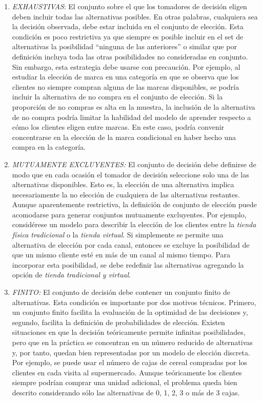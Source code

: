 \documentclass[
]{book}
\begin{document}
\begin{enumerate}
\def\labelenumi{\arabic{enumi}.}
\item
  \emph{EXHAUSTIVAS}: El conjunto sobre el que los tomadores de decisión eligen deben incluir todas las alternativas posibles. En otras palabras, cualquiera sea la decisión observada, debe
  estar incluida en el conjunto de elección. Esta condición es poco restrictiva ya que siempre es posible incluir en el set de alternativas la posibilidad ``ninguna de las anteriores'' o similar que por definición incluya toda las otras posibilidades no consideradas en conjunto. Sin embargo, esta estrategia debe usarse con precaución. Por ejemplo, al estudiar la elección de marca en una categoría en que se observa que los clientes no siempre compran alguna
  de las marcas disponibles, se podría incluir la alternativa de no compra en el conjunto de elección. Si la proporción de no compras es alta en la muestra, la inclusión de la alternativa de no compra podría limitar la habilidad del modelo de aprender respecto a cómo los clientes eligen entre marcas. En este caso, podría convenir concentrarse en la elección de la marca condicional en haber hecho una compra en la categoría.
\item
  \emph{MUTUAMENTE EXCLUYENTES:} El conjunto de decisión debe definirse de modo que en cada ocasión el tomador de decisión seleccione solo una de las alternativas disponibles. Esto es, la elección de una alternativa implica necesariamente la no elección de cualquiera de las alternativas restantes. Aunque aparentemente restrictiva, la definición de conjunto de elección puede acomodarse para generar conjuntos mutuamente excluyentes. Por ejemplo, considérese un modelo para describir la elección de los clientes entre la \emph{tienda física tradicional} o la \emph{tienda virtual}. Si simplemente se permite una alternativa de elección por cada canal, entonces se excluye la posibilidad de que un mismo cliente esté en más de un canal al mismo tiempo. Para incorporar esta posibilidad, se debe redefinir las alternativas agregando la opción de \emph{tienda tradicional y virtual}.
\item
  \emph{FINITO:} El conjunto de decisión debe contener un conjunto finito de alternativas. Esta condición es importante por dos motivos técnicos. Primero, un conjunto finito facilita la evaluación de la optimidad de las decisiones y, segundo, facilita la definición de probabilidades de elección. Existen situaciones en que la decisión teóricamente permite infinitas posibilidades, pero que en la práctica se concentran en un número reducido de alternativas y, por tanto, quedan bien representadas por un modelo de elección discreta. Por ejemplo, se puede usar el número de cajas de cereal compradas por los clientes en cada visita al supermercado. Aunque teóricamente los clientes siempre podrían comprar una unidad adicional, el problema queda bien descrito considerando sólo las alternativas de 0, 1, 2, 3 o más de 3 cajas.
\end{enumerate}
\end{document}
